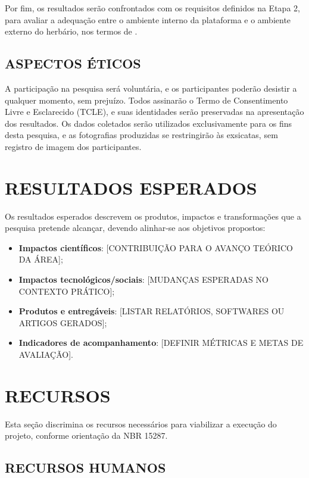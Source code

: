 \documentclass[
    12pt,        %
    openany,     %
    oneside,     %
    a4paper,     %
    english,     %
    french,      %
    spanish,     %
    brazil,      %
    article      %
]{abntex2}
\begin{document}
Por fim, os resultados serão confrontados com os requisitos definidos na Etapa 2, para avaliar a adequação entre o ambiente interno da plataforma e o ambiente externo do herbário, nos termos de .

\subsection{ASPECTOS ÉTICOS}
\label{subsec:aspectos-eticos}

A participação na pesquisa será voluntária, e os participantes poderão desistir a qualquer momento, sem prejuízo. Todos assinarão o Termo de Consentimento Livre e Esclarecido (TCLE), e suas identidades serão preservadas na apresentação dos resultados. Os dados coletados serão utilizados exclusivamente para os fins desta pesquisa, e as fotografias produzidas se restringirão às exsicatas, sem registro de imagem dos participantes.


\section{RESULTADOS ESPERADOS}
\label{sec:resultados-esperados}

Os resultados esperados descrevem os produtos, impactos e transformações que a pesquisa pretende alcançar, devendo alinhar-se aos objetivos propostos:

\begin{itemize}
    \item \textbf{Impactos científicos}: [CONTRIBUIÇÃO PARA O AVANÇO TEÓRICO DA ÁREA];
    \item \textbf{Impactos tecnológicos/sociais}: [MUDANÇAS ESPERADAS NO CONTEXTO PRÁTICO];
    \item \textbf{Produtos e entregáveis}: [LISTAR RELATÓRIOS, SOFTWARES OU ARTIGOS GERADOS];
    \item \textbf{Indicadores de acompanhamento}: [DEFINIR MÉTRICAS E METAS DE AVALIAÇÃO].
\end{itemize}


\section{RECURSOS}
\label{sec:recursos}

Esta seção discrimina os recursos necessários para viabilizar a execução do projeto, conforme orientação da NBR 15287.

\subsection{RECURSOS HUMANOS}
\label{subsec:recursos-humanos}
\end{document}
